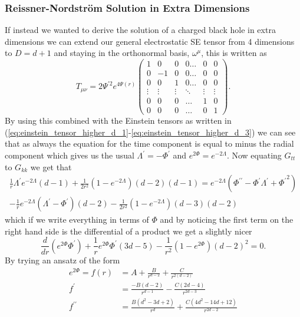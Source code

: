 \documentclass[12pt]{article}
\numberwithin{equation}{section}
\numberwithin{figure}{section}
\begin{document}
\subsubsection{Reissner-Nordstr\"om Solution in Extra Dimensions} %
\label{sub:reissner_nordstom_soltuion_in_extra_dimensions}
If instead we wanted to derive the solution of a charged black hole in extra dimensions we can extend our general electrostatic SE tensor from 4 dimensions to $D=d+1$ and staying in the orthonormal basis, $\omega^{\mu}$, this is written as
\begin{equation}
		T_{\mu\nu}= 
		2\Psi ^{\prime 2} e^{4\Psi(r)}\begin{pmatrix}
		1 & 0 & 0 & 0\dots & 0 & 0 \\
		0 & -1 & 0 & 0\dots & 0 & 0 \\
		0 & 0 & 1 & 0\dots & 0 & 0 \\
		\vdots & \vdots & \vdots & \ddots & \vdots & \vdots \\
		0 & 0 & 0 & \dots & 1 & 0 \\
		0 & 0 & 0 & \dots & 0 & 1
	\end{pmatrix}.
\end{equation}
By using this combined with the Einstein tensors as written in (\ref{eq:einstein_tensor_higher_d_1}-\ref{eq:einstein_tensor_higher_d_3}) we can see that as always the equation for the  time component is equal to minus the radial component which gives us the usual $\Lambda ^{\prime}  = - \Phi ^{\prime}$ and $e^{2\Phi}=e^{-2\Lambda}$. Now equating $G_{tt}$ to $G_{kk}$ we get that
\begin{multline}
\frac{1}{r} \Lambda ^{\prime} e^{-2\Lambda}(d-1) + \frac{1}{2r^{2}}(1-e^{-2\Lambda})(d-2)(d-1) = e^{-2\Lambda}(\Phi ^{\prime\prime} - \Phi ^{\prime} \Lambda ^{\prime} +{\Phi ^{\prime}}^2) \\-\frac{1}{r} e^{-2\Lambda}(\Lambda ^{\prime} -\Phi ^{\prime})(d-2)- \frac{1}{2r^{2}}(1-e^{-2\Lambda})(d-3)(d-2)
\end{multline}
which if we write everything in terms of $\Phi$ and by noticing the first term on the right hand side is the differential of a product we get a slightly nicer
\begin{equation}
	\frac{d}{dr}(e^{2\Phi}\Phi ^{\prime} )+ \frac{1}{r}e^{2\Phi}\Phi ^{\prime}(3d-5) - \frac{1}{r^{2}}(1-e^{2\Phi})(d-2)^{2}=0.\label{eq:higher_d_em_to_solve}
\end{equation}
By trying an ansatz of the form
\begin{align}
	e^{2\Phi}=f(r)&=A+\frac{B}{r^{d-2}}+\frac{C}{r^{2(d-2)}}\\
	f ^{\prime} &= \frac{-B(d-2)}{r^{d-1}} -\frac{C(2d-4)}{r^{2d-3}}\\
	f ^{\prime\prime} &= \frac{B(d^{2}-3d+2)}{r^{d}} + \frac{C(4d^{2}-14d+12)}{r^{2d-2}} 
\end{align}
\end{document}
